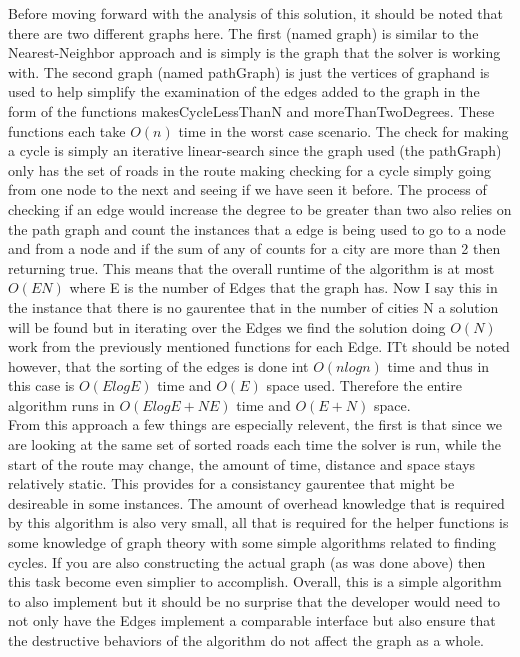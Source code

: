 \documentclass[midd]{thesis}
\newcommand{\tab}{\hspace*{2em}}
\begin{document}
\tab Before moving forward with the analysis of this solution, it should be noted that there are two different graphs here. The first (named graph) is similar to the Nearest-Neighbor approach and is simply is the graph that the solver is working with. The second graph (named pathGraph) is just the vertices of graphand is used to help simplify the examination of the edges added to the graph in the form of the functions makesCycleLessThanN and moreThanTwoDegrees. These functions each take $O(n)$ time in the worst case scenario. The check for making a cycle is simply an iterative linear-search since the graph used (the pathGraph) only has the set of roads in the route making checking for a cycle simply going from one node to the next and seeing if we have seen it before. The process of checking if an edge would increase the degree to be greater than two also relies on the path graph and count the instances that a edge is being used to go to a node and from a node and if the sum of any of counts for a city are more than 2 then returning true. This means that the overall runtime of the algorithm is at most $O(EN)$ where E is the number of Edges that the graph has. Now I say this in the instance that there is no gaurentee that in the number of cities N a solution will be found but in iterating over the Edges we find the solution doing $O(N)$ work from the previously mentioned functions for each Edge. ITt should be noted however, that the sorting of the edges is done int $O(nlogn)$ time and thus in this case is $O(ElogE)$ time and $O(E)$ space used. Therefore the entire algorithm runs in $O(ElogE + NE)$ time and $O(E+N)$ space.\\
\tab From this approach a few things are especially relevent, the first is that since we are looking at the same set of sorted roads each time the solver is run, while the start of the route may change, the amount of time, distance and space stays relatively static. This provides for a consistancy gaurentee that might be desireable in some instances. The amount of overhead knowledge that is required by this algorithm is also very small, all that is required for the helper functions is some knowledge of graph theory with some simple algorithms related to finding cycles. If you are also constructing the actual graph (as was done above) then this task become even simplier to accomplish. Overall, this is a simple algorithm to also implement but it should be no surprise that the developer would need to not only have the Edges implement a comparable interface but also ensure that the destructive behaviors of the algorithm do not affect the graph as a whole.
\end{document}
